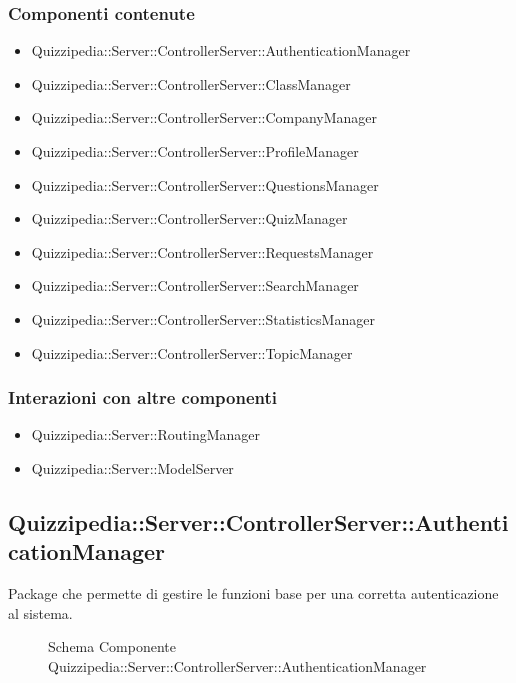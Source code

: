 \subsubsection{Componenti contenute}
\begin{itemize}
\item Quizzipedia::Server::ControllerServer::AuthenticationManager
\item Quizzipedia::Server::ControllerServer::ClassManager
\item Quizzipedia::Server::ControllerServer::CompanyManager
\item Quizzipedia::Server::ControllerServer::ProfileManager
\item Quizzipedia::Server::ControllerServer::QuestionsManager
\item Quizzipedia::Server::ControllerServer::QuizManager
\item Quizzipedia::Server::ControllerServer::RequestsManager
\item Quizzipedia::Server::ControllerServer::SearchManager
\item Quizzipedia::Server::ControllerServer::StatisticsManager
\item Quizzipedia::Server::ControllerServer::TopicManager
\end{itemize}
\subsubsection{Interazioni con altre componenti}
\begin{itemize}
\item Quizzipedia::Server::RoutingManager
\end{itemize}
\begin{itemize}
\item Quizzipedia::Server::ModelServer
\end{itemize}
\subsection{Quizzipedia::Server::ControllerServer::AuthenticationManager}
Package che permette di gestire le funzioni base per una corretta autenticazione al sistema.
\begin{figure}[H]
\centering
\noindent{}
\caption[Schema Componente Quizzipedia::Server::ControllerServer::AuthenticationManager]{Schema Componente Quizzipedia::Server::ControllerServer::AuthenticationManager}
\end{figure}
